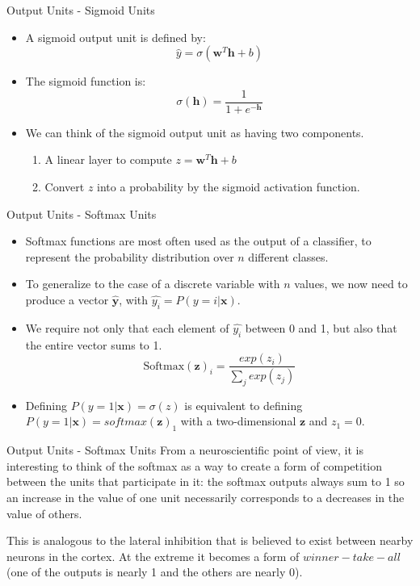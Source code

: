 \documentclass[10pt]{beamer}
\begin{document}
	\begin{frame}{Output Units - Sigmoid Units}
		\begin{itemize}
			\item A sigmoid output unit is defined by:
			$$\hat{y}=\sigma(\bm{w}^T\bm{h}+b)$$

			\pause
			\item The sigmoid function is:
			$$\sigma(\bm{h})=\frac{1}{1+e^{-\bm{h}}}$$

			\pause
			\item We can think of the sigmoid output unit as having two components.
			\begin{enumerate}
				\item A linear layer to compute $z=\bm{w}^T\bm{h}+b$
				\item Convert $z$ into a probability by the sigmoid activation function.
			\end{enumerate}
		\end{itemize}
	\end{frame}

	\begin{frame}{Output Units - Softmax Units}
		\begin{itemize}
			\pause
			\item Softmax functions are most often used as the output of a classifier, to represent the probability distribution over $n$ different classes.
			\pause
			\item To generalize to the case of a discrete variable with $n$ values, we now need to produce a vector $\hat{\bm{y}}$, with $\hat{y_i}=P(y=i|\bm{x})$. 
			\pause
			\item We require not only that each element of $\hat{y_i}$ between 0 and 1, but also that the entire vector sums to 1.
			$$\mathrm{Softmax}(\bm{z})_i=\frac{exp(z_i)}{\sum_jexp(z_j)}$$

			\pause
			\item Defining $P(y=1|\bm{x})=\sigma(z)$ is equivalent to defining $P(y=1|\bm{x})=softmax(\bm{z})_1$ with a two-dimensional $\bm{z}$ and $z_1=0$.
			
		\end{itemize}
	\end{frame}

	\begin{frame}{Output Units - Softmax Units}
		From a neuroscientific point of view, it is interesting to think of the softmax as a way to create a form of competition between the units that participate in it: the softmax outputs always sum to 1 so an increase in the value of one unit necessarily corresponds to a decreases in the value of others. 
		
		This is analogous to the lateral inhibition that is believed to exist between nearby neurons in the cortex. At the extreme it becomes a form of $winner-take-all$ (one of the outputs is nearly 1 and the others are nearly 0).
	\end{frame}
\end{document}
